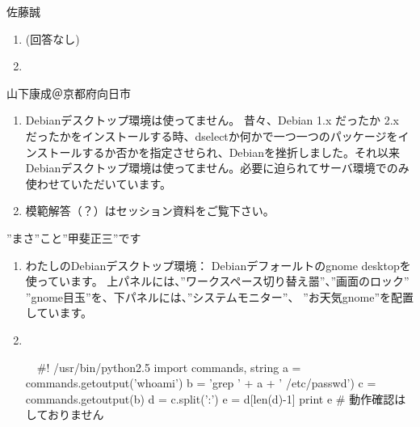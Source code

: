 \documentclass[mingoth,a4paper]{jsarticle}
\begin{document}
\begin{prework}{ 佐藤誠 }
\begin{enumerate}
 \item (回答なし)
 \item 　
\end{enumerate}
\end{prework}

\begin{prework}{ 山下康成＠京都府向日市 }
\begin{enumerate}
 \item Debianデスクトップ環境は使ってません。
昔々、Debian 1.x だったか 2.x だったかをインストールする時、dselectか何かで一つ一つのパッケージをインストールするか否かを指定させられ、Debianを挫折しました。それ以来Debianデスクトップ環境は使ってません。必要に迫られてサーバ環境でのみ使わせていただいています。
 \item 模範解答（？）はセッション資料をご覧下さい。
\end{enumerate}
\end{prework}

\begin{prework}{ ”まさ”こと”甲斐正三”です }
\begin{enumerate}
      \item わたしのDebianデスクトップ環境：
    Debianデフォールトのgnome desktopを使っています。
    上パネルには、”ワークスペース切り替え噐”、”画面のロック”
    ”gnome目玉”を、下パネルには、”システムモニター”、
    ”お天気gnome”を配置しています。
 \item　
\begin{commandline}
    　#! /usr/bin/python2.5
    import commands, string
    a = commands.getoutput('whoami')
    b = 'grep ' + a + ' /etc/passwd')
    c = commands.getoutput(b)
    d = c.split(':')
    e = d[len(d)-1]
    print e 
    #  動作確認はしておりません
\end{commandline}
\end{enumerate}

\end{prework}
\end{document}
